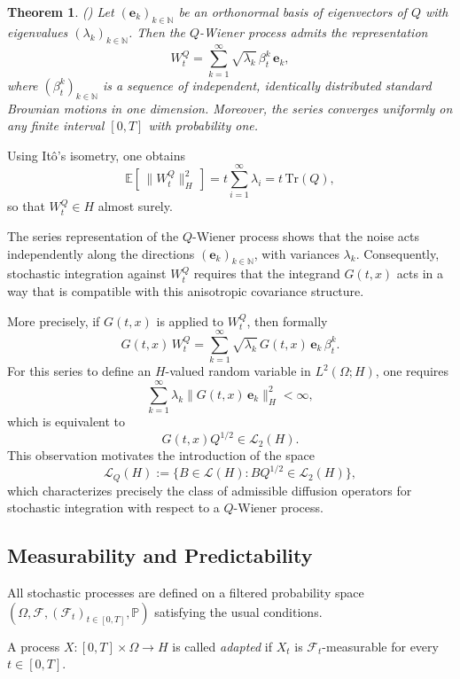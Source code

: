 \documentclass[12pt]{amsart}
\numberwithin{equation}{section}
\newtheorem{theorem}{Theorem}[section]
\begin{document}
\begin{theorem}(\cite[Theorem 2.5 in Chapter 6, p.165]{chow2007stochastic})
Let $(\mathbf{e}_k)_{k\in\mathbb{N}}$ be an orthonormal basis of eigenvectors of $Q$ with eigenvalues $(\lambda_k)_{k\in\mathbb{N}}$. Then the $Q$-Wiener process admits the representation
\[
    W_{t}^{Q} = \sum_{k=1}^{\infty}\sqrt{\lambda_k}\, \beta_{t}^{k}\,\mathbf{e}_{k},
\]
where $(\beta_t^k)_{k\in\mathbb{N}}$ is a sequence of independent, identically distributed standard Brownian motions in one dimension. Moreover, the series converges uniformly on any finite interval $[0,T]$ with probability one. 
\end{theorem}

Using It\^o's isometry, one obtains
\[
    \mathbb{E}[\,\|W_t^{Q}\|_H^2\,] = t \sum_{i=1}^{\infty} \lambda_i = t\,\mathrm{Tr}(Q),
\]
so that $W_t^Q \in H$ almost surely.


The series representation of the $Q$-Wiener process shows that the noise acts independently along the directions $(\mathbf{e}_k)_{k\in\mathbb{N}}$, with variances $\lambda_k$. Consequently, stochastic integration against $W_t^Q$ requires that the integrand $G(t,x)$ acts in a way that is compatible with this anisotropic covariance structure.

More precisely, if $G(t,x)$ is applied to $W_t^Q$, then formally
\[
    G(t,x)\,W_t^Q = \sum_{k=1}^\infty \sqrt{\lambda_k}\, G(t,x)\,\mathbf{e}_k\, \beta_t^k.
\]
For this series to define an $H$-valued random variable in $L^2(\Omega;H)$, one requires
\[
    \sum_{k=1}^\infty \lambda_k \|G(t,x)\,\mathbf{e}_k\|_H^2 < \infty,
\]
which is equivalent to
\[
    G(t,x)Q^{1/2} \in \mathscr{L}_2(H).
\]
This observation motivates the introduction of the space
\[
    \mathscr{L}_Q(H) := \{B \in \mathscr{L}(H) : BQ^{1/2} \in \mathscr{L}_2(H)\},
\]
which characterizes precisely the class of admissible diffusion operators for stochastic integration with respect to a $Q$-Wiener process.


\subsection{Measurability and Predictability}

All stochastic processes are defined on a filtered probability space $(\Omega,\mathscr{F},(\mathscr{F}_t)_{t\in[0,T]},\mathbb{P})$ satisfying the usual conditions.

A process $X:[0,T]\times\Omega\to H$ is called \emph{adapted} if $X_t$ is $\mathscr{F}_t$-measurable for every $t\in[0,T]$.
\end{document}

